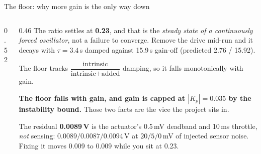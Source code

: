 \documentclass[aspectratio=169]{beamer}
\begin{document}
\begin{frame}{The floor: why more gain is the only way down}
  \begin{columns}[T]
    \begin{column}{0.52\textwidth}
      \centering
    \end{column}
    \begin{column}{0.46\textwidth}
      \footnotesize
      The ratio settles at \textbf{0.23}, and that is the \emph{steady state of
      a continuously forced oscillator}, not a failure to converge. Remove the
      drive mid-run and it decays with $\tau = 3.4$\,s damped against 15.9\,s
      gain-off (predicted 2.76 / 15.92).

      \vspace{2mm}
      The floor tracks $\dfrac{\text{intrinsic}}{\text{intrinsic} +
      \text{added}}$ damping, so it falls monotonically with gain.

      \vspace{2mm}
      \textbf{The floor falls with gain, and gain is capped at
      $|K_p| = 0.035$ by the instability bound.} Those two facts are the vice
      the project sits in.

      \vspace{2mm}
      The residual \textbf{0.0089\,V} is the actuator's 0.5\,mV deadband and
      10\,ms throttle, \emph{not} sensing: $0.0089 / 0.0087 / 0.0094$\,V at
      $20 / 5 / 0$\,mV of injected sensor noise. Fixing it moves 0.009 to 0.009
      while you sit at 0.23.
    \end{column}
  \end{columns}
\end{frame}
\end{document}
